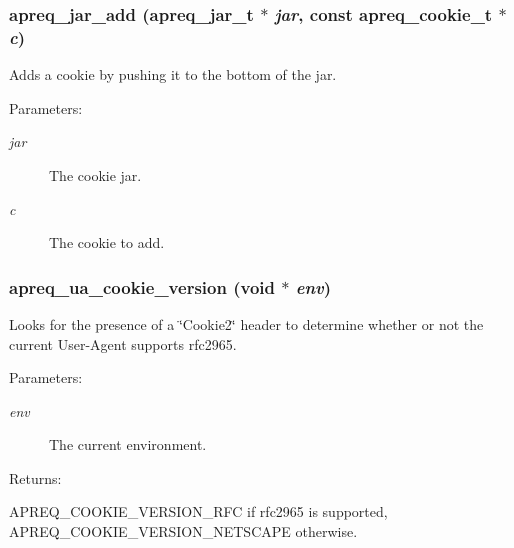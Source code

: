 \subsubsection{ apreq\_\-jar\_\-add ({\bf apreq\_\-jar\_\-t} $\ast$ {\em jar}, const {\bf apreq\_\-cookie\_\-t} $\ast$ {\em c})}\label{group__cookies_a3}


Adds a cookie by pushing it to the bottom of the jar.\begin{Desc}
\item[Parameters: ]\par
\begin{description}
\item[{\em 
jar}]The cookie jar. \item[{\em 
c}]The cookie to add. \end{description}
\end{Desc}
\subsubsection{ apreq\_\-ua\_\-cookie\_\-version ({\bf void} $\ast$ {\em env})}\label{group__cookies_a12}


Looks for the presence of a \char`\"{}Cookie2\char`\"{} header to determine whether or not the current User-Agent supports rfc2965. \begin{Desc}
\item[Parameters: ]\par
\begin{description}
\item[{\em 
env}]The current environment. \end{description}
\end{Desc}
\begin{Desc}
\item[Returns: ]\par
APREQ\_\-COOKIE\_\-VERSION\_\-RFC if rfc2965 is supported,  APREQ\_\-COOKIE\_\-VERSION\_\-NETSCAPE otherwise. \end{Desc}
